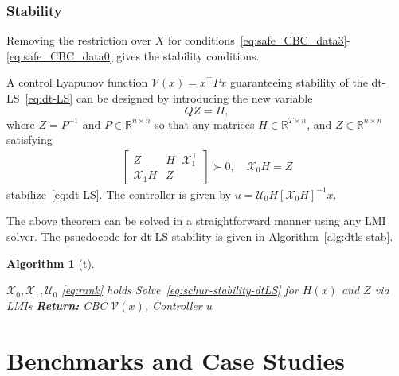 \documentclass[sigconf]{acmart}
\newtheorem{algorithm}{Algorithm}
\newcommand{\BW}{\textcolor{red}}
\begin{document}
\subsubsection{Stability}

Removing the restriction over $X$ for conditions~\eqref{eq:safe_CBC_data3}-\eqref{eq:safe_CBC_data0} gives the stability conditions.

\begin{theorem}
\label{thm:dtLS-stable}
A control Lyapunov function $\mathcal{V}(x)=x^\top Px$ guaranteeing stability of the dt-LS~\eqref{eq:dt-LS} can be designed by introducing the new variable
\begin{equation*}
\label{eq:H=QP}
QZ=H,
\end{equation*}
where $Z=P^{-1}$ and $P\in\mathbb{R}^{n\times n}$ so that any matrices $H\in\mathbb{R}^{T\times n}$, and $Z\in\mathbb{R}^{n\times n}$ satisfying
\begin{align}
\label{eq:schur-stability-dtLS}
\begin{bmatrix}
Z                 & H^\top\mathcal{X}_{1}^\top \\
\mathcal{X}_{1} H & Z
\end{bmatrix} \succ 0, \quad \mathcal{X}_{0}H=Z
\end{align}
stabilize~\eqref{eq:dt-LS}.
The controller is given by $u= \mathcal{U}_{0}H[\mathcal{X}_0H]^{-1}x.$
\end{theorem}

The above theorem can be solved in a straightforward manner using any LMI solver.  The psuedocode for dt-LS stability is given in Algorithm~\ref{alg:dtls-stab}.

\begin{algorithm}[t]
\caption{Hierarchy for dt-NPS Stability}\label{alg:dtls-stab}
\begin{algorithmic}[1]
\Require $\mathcal{X}_0,\mathcal{X}_1,\mathcal{U}_0$
\Ensure \eqref{eq:rank} holds
\State Solve~\eqref{eq:schur-stability-dtLS} for $H(x)$ and $Z$ via LMIs
\noindent\Statex\textbf{Return:} CBC $\mathcal{V}(x)$, Controller $u$
\end{algorithmic}
\end{algorithm}



\section{Benchmarks and Case Studies}\label{sec:benchmarks-and-case-studies}
\end{document}
